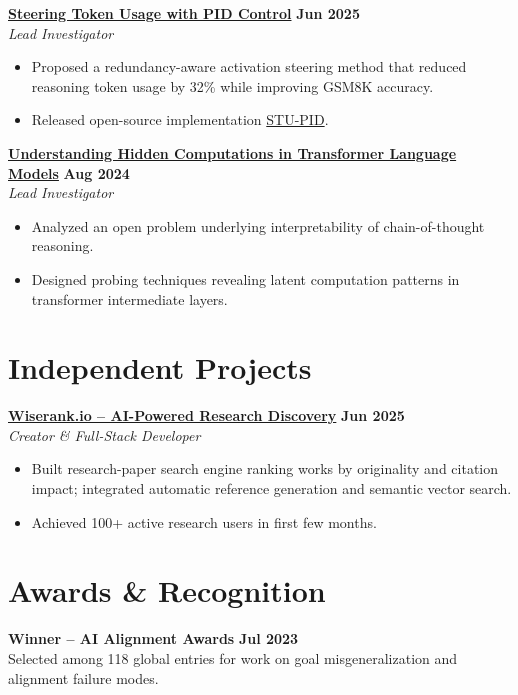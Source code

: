 \documentclass[11pt]{article}
\begin{document}
\textbf{\href{https://arxiv.org/abs/2506.18831}{Steering Token Usage with PID Control}} \hfill \textbf{Jun 2025}\\
\textit{Lead Investigator}
\begin{itemize}[leftmargin=*,nosep]
\item Proposed a redundancy-aware activation steering method that reduced reasoning token usage by 32\% while improving GSM8K accuracy.
\item Released open-source implementation \href{https://github.com/rokosbasilisk/STU-PID}{STU-PID}.
\end{itemize}

\textbf{\href{https://arxiv.org/html/2412.04537}{Understanding Hidden Computations in Transformer Language Models}} \hfill \textbf{Aug 2024}\\
\textit{Lead Investigator}
\begin{itemize}[leftmargin=*,nosep]
\item Analyzed an open problem underlying interpretability of chain-of-thought reasoning.
\item Designed probing techniques revealing latent computation patterns in transformer intermediate layers.
\end{itemize}

\section{Independent Projects}
\textbf{\href{https://wiserank.io}{Wiserank.io – AI-Powered Research Discovery}} \hfill \textbf{Jun 2025}\\
\textit{Creator \& Full-Stack Developer}
\begin{itemize}[leftmargin=*,nosep]
\item Built research-paper search engine ranking works by originality and citation impact; integrated automatic reference generation and semantic vector search.
\item Achieved 100+ active research users in first few months.
\end{itemize}

\section{Awards \& Recognition}
\textbf{Winner – AI Alignment Awards} \hfill \textbf{Jul 2023}\\
Selected among 118 global entries for work on goal misgeneralization and alignment failure modes.
\end{document}
